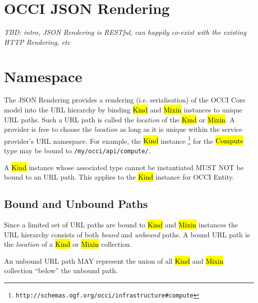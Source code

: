 \documentclass[10pt,a4paper]{article}
\begin{document}
\section{OCCI JSON Rendering}
{\em TBD: intro, JSON Rendering is RESTful, can happily co-exist with the
existing HTTP Rendering, etc}

\section{Namespace}

The JSON Rendering provides a rendering (i.e. serialisation) of the OCCI 
Core model into the URL hierarchy by binding
\hl{Kind} and \hl{Mixin} instances to unique URL paths. Such a URL path is called
the {\em location} of the \hl{Kind} or \hl{Mixin}.
A provider is free to choose the {\em location} as long as it is unique
within the service provider's URL namespace.
For example, the \hl{Kind} instance%
\footnote{\tt http://schemas.ogf.org/occi/infrastructure\#compute}
for the \hl{Compute} type may be bound to {\tt /my/occi/api/compute/}.

A \hl{Kind} instance whose associated type cannot be instantiated MUST NOT be
bound to an URL path. This applies to the \hl{Kind} instance for OCCI Entity.

\subsection{Bound and Unbound Paths}

Since a limited set of URL paths are bound to \hl{Kind} and \hl{Mixin}
instances the URL hierarchy consists of both {\em bound} and {\em unbound}
paths.
A bound URL path is the {\em location} of a \hl{Kind} or \hl{Mixin} collection.

An unbound URL path MAY represent the union of all \hl{Kind} and \hl{Mixin}
collection ``below'' the unbound path.

\end{document}
